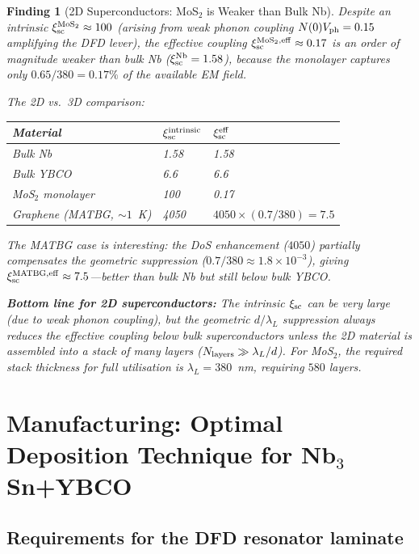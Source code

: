\documentclass[11pt]{article}
\newtheorem{finding}{Finding}
\newcommand{\ee}[1]{\times 10^{#1}}
\begin{document}
\begin{finding}[2D Superconductors: MoS$_2$ is Weaker than Bulk Nb]
\label{finding:2D-MoS2}
Despite an intrinsic $\xi_{\rm sc}^{\rm MoS_2} \approx 100$ (arising from weak
phonon coupling $N(0)V_{\rm ph} = 0.15$ amplifying the DFD lever), the
effective coupling $\xi_{\rm sc}^{\rm MoS_2,eff} \approx 0.17$ is an order of
magnitude weaker than bulk Nb ($\xi_{\rm sc}^{\rm Nb} = 1.58$), because the
monolayer captures only $0.65/380 = 0.17\%$ of the available EM field.

The 2D vs.\ 3D comparison:
\begin{center}
\begin{tabular}{lll}
\toprule
Material & $\xi_{\rm sc}^{\rm intrinsic}$ & $\xi_{\rm sc}^{\rm eff}$ \\
\midrule
Bulk Nb & 1.58 & 1.58 \\
Bulk YBCO & 6.6 & 6.6 \\
MoS$_2$ monolayer & 100 & 0.17 \\
Graphene (MATBG, $\sim 1$~K) & 4050 & $4050 \times (0.7/380) = 7.5$ \\
\bottomrule
\end{tabular}
\end{center}
The MATBG case is interesting: the DoS enhancement ($4050$) partially
compensates the geometric suppression ($0.7/380 \approx 1.8\ee{-3}$),
giving $\xi_{\rm sc}^{\rm MATBG,eff} \approx 7.5$---better than bulk Nb but
still below bulk YBCO.

\textbf{Bottom line for 2D superconductors:} The intrinsic $\xi_{\rm sc}$
can be very large (due to weak phonon coupling), but the geometric $d/\lambda_L$
suppression always reduces the effective coupling below bulk superconductors
unless the 2D material is assembled into a stack of many layers ($N_{\rm layers}
\gg \lambda_L/d$). For MoS$_2$, the required stack thickness for full
utilisation is $\lambda_L = 380$~nm, requiring $580$ layers.
\end{finding}

\section{Manufacturing: Optimal Deposition Technique for Nb$_3$Sn+YBCO}
\label{sec:manufacturing}

\subsection{Requirements for the DFD resonator laminate}
\end{document}
